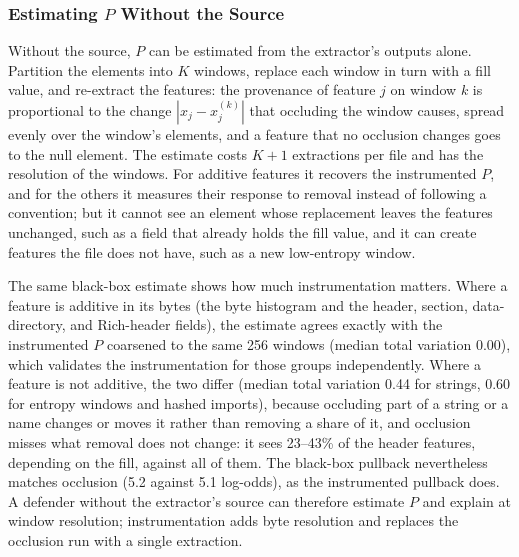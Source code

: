 \subsubsection{Estimating $P$ Without the Source}
\label{sec:XML:BlackBoxP}

Without the source, $P$ can be estimated from the extractor's outputs alone.
Partition the elements into $K$ windows, replace each window in turn with a fill value, and re-extract the features:
the provenance of feature $j$ on window $k$ is proportional to the change $|x_j - x_j^{(k)}|$ that occluding the
window causes, spread evenly over the window's elements, and a feature that no occlusion changes goes to the null
element. The estimate costs $K + 1$ extractions per file and has the resolution of the windows. For additive features
it recovers the instrumented $P$, and for the others it measures their response to removal instead of following a
convention; but it cannot see an element whose replacement leaves the features unchanged, such as a field that
already holds the fill value, and it can create features the file does not have, such as a new low-entropy window.


The same black-box estimate shows how much instrumentation matters. Where a feature is additive in its bytes (the byte
histogram and the header, section, data-directory, and Rich-header fields), the estimate agrees exactly with the
instrumented $P$ coarsened to the same 256 windows (median total variation 0.00), which validates the instrumentation
for those groups independently. Where a feature is not additive, the two differ (median total variation 0.44 for
strings, 0.60 for entropy windows and hashed imports), because occluding part of a string or a name changes or moves
it rather than removing a share of it, and occlusion misses what removal does not change: it sees 23--43\% of the
header features, depending on the fill, against all of them. The black-box pullback nevertheless matches occlusion
(5.2 against 5.1 log-odds), as the instrumented pullback does. A defender without the extractor's source can therefore
estimate $P$ and explain at window resolution; instrumentation adds byte resolution and replaces the occlusion run with
a single extraction. 